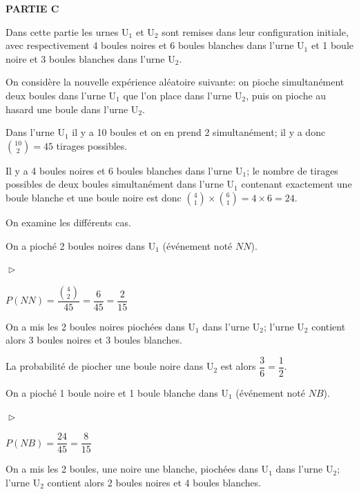 \documentclass[10pt]{article}
\providecommand{\ds}{\displaystyle}
\begin{document}
\bigskip

\textbf{PARTIE C}

\medskip

Dans cette partie les urnes U$_1$ et U$_2$ sont remises dans leur configuration initiale, avec respectivement 4 boules noires et 6 boules blanches dans l'urne U$_1$ et 1 boule noire et 3 boules blanches dans l'urne U$_2$.

\smallskip

On considère la nouvelle expérience aléatoire suivante: on pioche simultanément deux boules dans l'urne U$_1$ que l'on place dans l'urne U$_2$, puis on pioche au hasard une boule dans l'urne U$_2$.

\medskip

\begin{enumerate}
\item
Dans l'urne U$_1$ il y a 10 boules et on en prend 2 simultanément; il y a donc $\ds\binom{10}{2}=45$ tirages possibles.

\item
Il y a 4 boules noires et 6 boules blanches dans l'urne U$_1$; le nombre de tirages possibles de deux boules simultanément dans l'urne U$_1$ contenant exactement une boule blanche et une boule noire est donc $\ds\binom{4}{1}\times \binom{6}{1} = 4\times 6 = 24$.

\item 
\begin{list}{\textbullet}{On examine les différents cas.}
\item On a pioché 2 boules noires dans U$_1$ (événement noté $NN$).

\begin{list}{$\vartriangleright$}{}
\item $P\left (NN\right ) = \dfrac{\binom{4}{2}}{45} = \dfrac{6}{45}=\dfrac{2}{15}$
\item On a mis les 2 boules noires piochées dans U$_1$ dans l'urne U$_2$; l'urne U$_2$ contient alors 3 boules noires et 3 boules blanches. 

La probabilité de piocher une boule noire dans U$_2$ est alors $\dfrac{3}{6}=\dfrac{1}{2}$.
\end{list}

\item On a pioché 1 boule noire et 1 boule blanche dans U$_1$ (événement noté $NB$).

\begin{list}{$\vartriangleright$}{}
\item $P\left (NB\right ) = \dfrac{24}{45} =\dfrac{8}{15}$
\item On a mis les 2 boules,  une noire une blanche, piochées dans U$_1$ dans l'urne U$_2$; l'urne U$_2$ contient alors 2 boules noires et 4 boules blanches. 


\end{list}
\end{list}
\end{enumerate}
\end{document}
